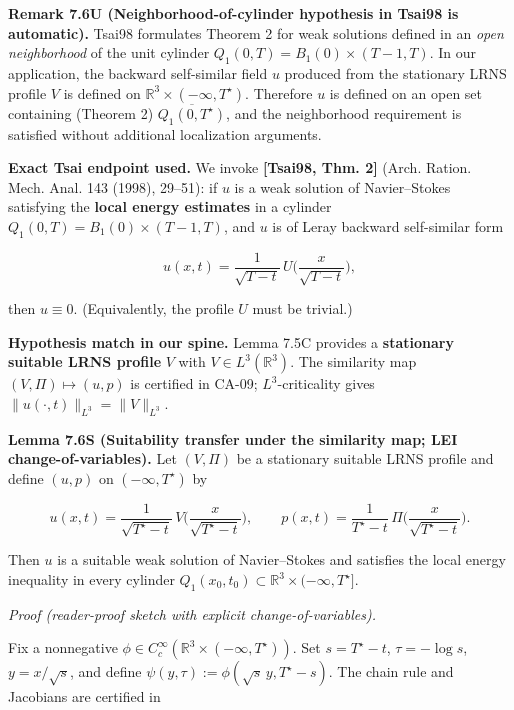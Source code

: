 \documentclass[
  11pt,
]{article}
\begin{document}
\textbf{Remark 7.6U (Neighborhood-of-cylinder hypothesis in Tsai98 is automatic).} Tsai98 formulates Theorem 2 for weak solutions defined in an \emph{open neighborhood} of the unit cylinder \(Q_1(0,T)=B_1(0)\times(T-1,T)\). In our application, the backward self-similar field \(u\) produced from the stationary LRNS profile \(V\) is defined on \(\mathbb R^3\times(-\infty,T^\star)\). Therefore \(u\) is defined on an open set containing (Theorem 2) \(\overline{Q_1(0,T^\star)}\), and the neighborhood requirement is satisfied without additional localization arguments.

\textbf{Exact Tsai endpoint used.} We invoke \textbf{{[}Tsai98, Thm. 2{]}} (Arch. Ration. Mech. Anal. 143 (1998), 29--51): if \(u\) is a weak solution of Navier--Stokes satisfying the \textbf{local energy estimates} in a cylinder \(Q_1(0,T)=B_1(0)\times(T-1,T)\), and \(u\) is of Leray backward self-similar form

\begin{equation}
u(x,t)=\frac{1}{\sqrt{T-t}}\,U\!\Big(\frac{x}{\sqrt{T-t}}\Big),
\tag{7.36}\label{eq:7_36_tsai_ansatz}
\end{equation}

then \(u\equiv 0\). (Equivalently, the profile \(U\) must be trivial.)

\textbf{Hypothesis match in our spine.} Lemma 7.5C provides a \textbf{stationary suitable LRNS profile} \(V\) with \(V\in L^3(\mathbb R^3)\). The similarity map \((V,\Pi)\mapsto(u,p)\) is certified in CA-09; \(L^3\)-criticality gives \(\|u(\cdot,t)\|_{L^3}=\|V\|_{L^3}\).

\textbf{Lemma 7.6S (Suitability transfer under the similarity map; LEI change-of-variables).} Let \((V,\Pi)\) be a stationary suitable LRNS profile and define \((u,p)\) on \((-\infty,T^\star)\) by

\begin{equation}
u(x,t)=\frac{1}{\sqrt{T^\star-t}}\,V\!\Big(\frac{x}{\sqrt{T^\star-t}}\Big),\qquad
p(x,t)=\frac{1}{T^\star-t}\,\Pi\!\Big(\frac{x}{\sqrt{T^\star-t}}\Big).
\tag{7.35}\label{eq:7_35_selfsimilar_from_V_repeat}
\end{equation}

Then \(u\) is a suitable weak solution of Navier--Stokes and satisfies the local energy inequality in every cylinder \(Q_1(x_0,t_0)\subset\mathbb R^3\times(-\infty,T^\star]\).

\emph{Proof (reader-proof sketch with explicit change-of-variables).}

Fix a nonnegative \(\phi\in C_c^\infty(\mathbb R^3\times(-\infty,T^\star))\). Set \(s=T^\star-t\), \(\tau=-\log s\), \(y=x/\sqrt{s}\), and define \(\psi(y,\tau):=\phi(\sqrt{s}\,y,T^\star-s)\). The chain rule and Jacobians are certified in
\end{document}
